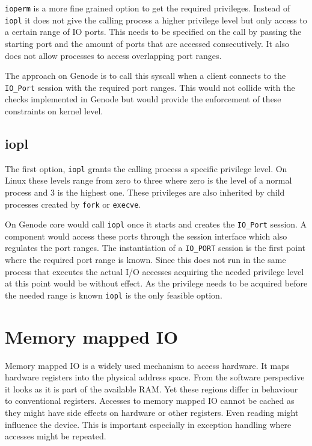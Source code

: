 \documentclass[
a4paper,
12pt,
notitlepage,
parskip=half,
DIV=11,
]{scrbook}
\begin{document}
		\texttt{ioperm} is a more fine grained option to get the required privileges.
		Instead of \texttt{iopl} it does not give the calling process a higher privilege level but only access to a certain range of IO ports.
		This needs to be specified on the call by passing the starting port and the amount of ports that are accessed consecutively.
		It also does not allow processes to access overlapping port ranges. \citep{ioperm}
		
		The approach on Genode is to call this syscall when a client connects to the \texttt{IO\_Port} session with the required port ranges.
		This would not collide with the checks implemented in Genode but would provide the enforcement of these constraints on kernel level.
				
		\subsection{iopl}
		
		The first option, \texttt{iopl} grants the calling process a specific privilege level.
		On Linux these levels range from zero to three where zero is the level of a normal process and 3 is the highest one.
		These privileges are also inherited by child processes created by \texttt{fork} or \texttt{execve}. \citep{iopl}
		
		On Genode core would call \texttt{iopl} once it starts and creates the \texttt{IO\_Port} session.
		A component would access these ports through the session interface which also regulates the port ranges.
		The instantiation of a \texttt{IO\_PORT} session is the first point where the required port range is known.
		Since this does not run in the same process that executes the actual I/O accesses acquiring the needed privilege level at this point would be without effect.
		As the privilege needs to be acquired before the needed range is known \texttt{iopl} is the only feasible option.
		
		\section{Memory mapped IO}
		
		Memory mapped IO is a widely used mechanism to access hardware.
		It maps hardware registers into the physical address space.
		From the software perspective it looks as it is part of the available RAM.
		Yet these regions differ in behaviour to conventional registers.
		Accesses to memory mapped IO cannot be cached as they might have side effects on hardware or other registers.
		Even reading might influence the device.
		This is important especially in exception handling where accesses might be repeated.
		
\end{document}
